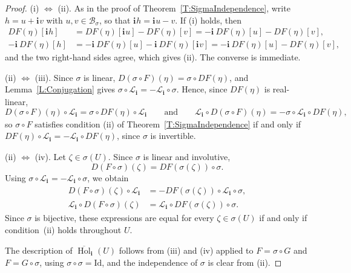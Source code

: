 \documentclass[12pt]{amsart}
\theoremstyle{plain}
\theoremstyle{definition}
\numberwithin{equation}{section}
\newcommand{\im}[1]{\mathbf{ i_{#1}}}
\newcommand{\cL}{\mathcal{L}}
\newcommand{\cB}{\mathcal{B}}
\DeclareMathOperator{\hol}{Hol}
\begin{document}
    \begin{proof}
    (i) $\Leftrightarrow$ (ii). As in the proof of Theorem~\ref{T:SigmaIndependence}, write $h = u + \im{} v$ with $u , v \in \cB_\sigma$, so that $\im{} h = \im{} u - v$. If (i) holds, then
    \begin{align*}
    DF (\eta ) [\im{} h] &= DF (\eta )[\im{} u] - D F (\eta ) [v] = -\im{}\, DF (\eta )[u] - DF (\eta ) [v] , \\
    -\im{}\, DF (\eta ) [h] &= -\im{}\, DF (\eta) [u] - \im{}\, DF (\eta ) [\im{} v] = -\im{}\, DF (\eta )[u] - DF (\eta )[v],
    \end{align*}
    and the two right-hand sides agree, which gives (ii). The converse is immediate.

    (ii) $\Leftrightarrow$ (iii). Since $\sigma$ is linear, $D (\sigma \circ F) (\eta ) = \sigma \circ DF (\eta )$, and Lemma~\ref{L:Conjugation} gives $\sigma \circ \cL_{\im{}} = - \cL_{\im{}} \circ \sigma$. Hence, since $DF (\eta )$ is real-linear,
    \[
    D (\sigma \circ F)(\eta ) \circ \cL_{\im{}} = \sigma \circ DF (\eta ) \circ \cL_{\im{}}
    \qquad \text{and} \qquad
    \cL_{\im{}} \circ D (\sigma \circ F) (\eta ) = - \sigma \circ \cL_{\im{}} \circ DF (\eta ),
    \]
    so $\sigma \circ F$ satisfies condition (ii) of Theorem~\ref{T:SigmaIndependence} if and only if $DF (\eta ) \circ \cL_{\im{}} = - \cL_{\im{}} \circ DF (\eta )$, since $\sigma$ is invertible.

    (ii) $\Leftrightarrow$ (iv). Let $\zeta\in\sigma(U)$. Since $\sigma$ is linear and involutive,
    \[
    D(F\circ\sigma)(\zeta)=DF(\sigma(\zeta))\circ\sigma.
    \]
    Using $\sigma\circ\cL_{\im{}}=-\cL_{\im{}}\circ\sigma$, we obtain
    \[
    \begin{aligned}
    D(F\circ\sigma)(\zeta)\circ\cL_{\im{}}
    &=-DF(\sigma(\zeta))\circ\cL_{\im{}}\circ\sigma,\\
    \cL_{\im{}}\circ D(F\circ\sigma)(\zeta)
    &=\cL_{\im{}}\circ DF(\sigma(\zeta))\circ\sigma.
    \end{aligned}
    \]
    Since $\sigma$ is bijective, these expressions are equal for every $\zeta\in\sigma(U)$ if and only if condition~(ii) holds throughout $U$.

    The description of $\overline{\hol}_{\im{}} (U)$ follows from (iii) and (iv) applied to $F = \sigma \circ G$ and $F = G \circ \sigma$, using $\sigma \circ \sigma = \mathrm{Id}$, and the independence of $\sigma$ is clear from (ii).
    \end{proof}
\end{document}
